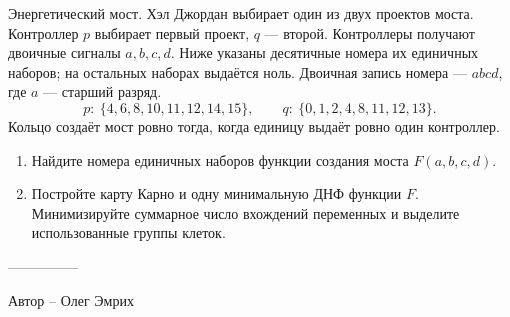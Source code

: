 \question
Энергетический мост. Хэл Джордан выбирает один из двух проектов моста. Контроллер $p$ выбирает первый проект, $q$ --- второй. Контроллеры получают двоичные сигналы $a,b,c,d$. Ниже указаны десятичные номера их единичных наборов; на остальных наборах выдаётся ноль. Двоичная запись номера --- $abcd$, где $a$ --- старший разряд.
\[
p:\ \{4, 6, 8, 10, 11, 12, 14, 15\},\qquad q:\ \{0, 1, 2, 4, 8, 11, 12, 13\}.
\]
Кольцо создаёт мост ровно тогда, когда единицу выдаёт ровно один контроллер.
\begin{enumerate}
\item Найдите номера единичных наборов функции создания моста $F(a,b,c,d)$.
\item Постройте карту Карно и одну минимальную ДНФ функции $F$. Минимизируйте суммарное число вхождений переменных и выделите использованные группы клеток.
\end{enumerate}

---------------

Автор -- Олег Эмрих
